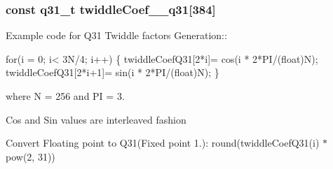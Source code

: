 \subsubsection[{\texorpdfstring{twiddle\+Coef\+\_\+256\+\_\+q31}{twiddleCoef_256_q31}}]{\setlength{\rightskip}{0pt plus 5cm}const q31\+\_\+t twiddle\+Coef\+\_\+\_\+q31\mbox{[}384\mbox{]}}\hypertarget{group__CFFT__CIFFT_gaef1ea005053b715b851cf5f908168ede}{}\label{group__CFFT__CIFFT_gaef1ea005053b715b851cf5f908168ede}
\begin{DoxyParagraph}{}
Example code for Q31 Twiddle factors Generation\+:\+: 
\end{DoxyParagraph}
\begin{DoxyParagraph}{}

\begin{DoxyPre}for(i = 0; i< 3N/4; i++)
\{
   twiddleCoefQ31[2*i]= cos(i * 2*PI/(float)N);
   twiddleCoefQ31[2*i+1]= sin(i * 2*PI/(float)N);
\} \end{DoxyPre}
 
\end{DoxyParagraph}
\begin{DoxyParagraph}{}
where N = 256 and PI = 3. 
\end{DoxyParagraph}
\begin{DoxyParagraph}{}
Cos and Sin values are interleaved fashion 
\end{DoxyParagraph}
\begin{DoxyParagraph}{}
Convert Floating point to Q31(Fixed point 1.)\+: round(twiddle\+Coef\+Q31(i) $\ast$ pow(2, 31)) 
\end{DoxyParagraph}
